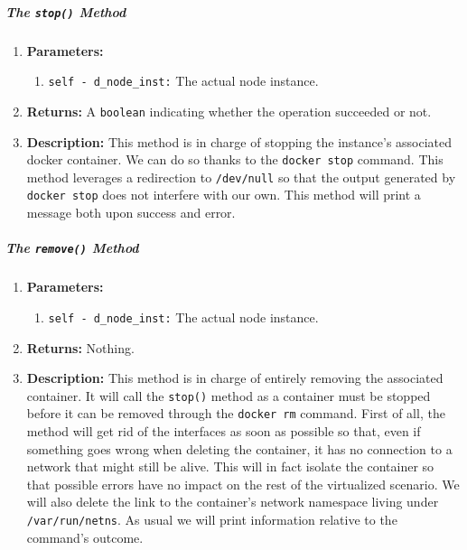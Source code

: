         \subparagraph{The \texttt{stop()} Method}
            \begin{enumerate}
                \item \textbf{Parameters:}
                \begin{enumerate}
                    \item \texttt{self - d\_node\_inst:} The actual node instance.
                \end{enumerate}
                \item \textbf{Returns:} A \texttt{boolean} indicating whether the operation succeeded or not.
                \item \textbf{Description:} This method is in charge of stopping the instance's associated docker container. We can do so thanks to the \texttt{docker stop} command. This method leverages a redirection to \texttt{/dev/null} so that the output generated by \texttt{docker stop} does not interfere with our own. This method will print a message both upon success and error.
            \end{enumerate}

        \subparagraph{The \texttt{remove()} Method}
            \begin{enumerate}
                \item \textbf{Parameters:}
                \begin{enumerate}
                    \item \texttt{self - d\_node\_inst:} The actual node instance.
                \end{enumerate}
                \item \textbf{Returns:} Nothing.
                \item \textbf{Description:} This method is in charge of entirely removing the associated container. It will call the \texttt{stop()} method as a container must be stopped before it can be removed through the \texttt{docker rm} command. First of all, the method will get rid of the interfaces as soon as possible so that, even if something goes wrong when deleting the container, it has no connection to a network that might still be alive. This will in fact isolate the container so that possible errors have no impact on the rest of the virtualized scenario. We will also delete the link to the container's network namespace living under \texttt{/var/run/netns}. As usual we will print information relative to the command's outcome.
            \end{enumerate}

